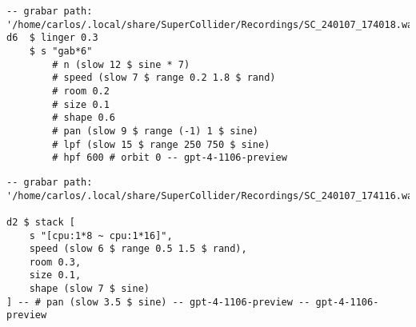 \begin{minipage}[t]{1\textwidth}
    \centering
    \begin{lstlisting}[style=SuperCollider-IDE, language=ExtendedHaskell, basicstyle=\footnotesize\ttfamily, numbers=none]
-- grabar path: '/home/carlos/.local/share/SuperCollider/Recordings/SC_240107_174018.wav'
d6  $ linger 0.3 
    $ s "gab*6" 
        # n (slow 12 $ sine * 7) 
        # speed (slow 7 $ range 0.2 1.8 $ rand) 
        # room 0.2 
        # size 0.1 
        # shape 0.6 
        # pan (slow 9 $ range (-1) 1 $ sine) 
        # lpf (slow 15 $ range 250 750 $ sine) 
        # hpf 600 # orbit 0 -- gpt-4-1106-preview
    \end{lstlisting}
    \vspace{1cm}
\end{minipage}





\begin{minipage}[t]{1\textwidth}
    \centering
    \begin{lstlisting}[style=SuperCollider-IDE, language=ExtendedHaskell, basicstyle=\footnotesize\ttfamily, numbers=none]
-- grabar path: '/home/carlos/.local/share/SuperCollider/Recordings/SC_240107_174116.wav'

d2 $ stack [
    s "[cpu:1*8 ~ cpu:1*16]",
    speed (slow 6 $ range 0.5 1.5 $ rand),
    room 0.3,
    size 0.1,
    shape (slow 7 $ sine)
] -- # pan (slow 3.5 $ sine) -- gpt-4-1106-preview -- gpt-4-1106-preview
    \end{lstlisting}
    \vspace{1cm}
\end{minipage}







